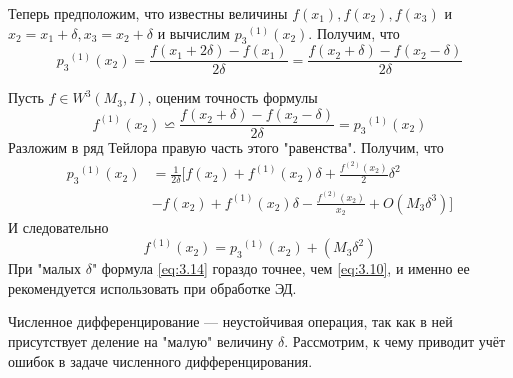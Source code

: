 Теперь предположим, что известны величины $f(x_1), f(x_2), f(x_3)$ и $x_2=x_1+\delta, x_3 = x_2 + \delta$ и вычислим  ${p_3}^{(1)}(x_2)$. Получим, что  
\begin{equation}
	{p_3}^{(1)}(x_2) = \frac{f(x_1+2\delta) - f(x_1)}{2\delta} = \frac{f(x_2+\delta) - f(x_2 - \delta)}{2\delta}
\end{equation}

Пусть $f \in W^3(M_3, I)$, оценим точность формулы
\begin{equation} \label{eq:3.14}
	f^{(1)}(x_2) \backsimeq \frac{f(x_2+\delta) - f(x_2 - \delta)}{2\delta} = {p_3}^{(1)}(x_2)
\end{equation}
Разложим в ряд Тейлора правую часть этого "равенства". Получим, что
\begin{dmath} 
	\begin{aligned}
		{p_3}^{(1)}(x_2) &= \frac{1}{2\delta} [f(x_2) + {f^{(1)}(x_2)}\delta + \frac{f^{(2)}(x_2)}{2} \delta^2 \\ &- f(x_2) + f^{(1)}(x_2)\delta - \frac{f^{(2)}(x_2)}{x_2} + O(M_3\delta^3)]
	\end{aligned}
\end{dmath}
И следовательно
\begin{equation}
	f^{(1)}(x_2) =  {p_3}^{(1)}(x_2) + (M_3\delta^2)
\end{equation}
При "малых $\delta$" формула \ref{eq:3.14} гораздо точнее, чем \ref{eq:3.10}, и именно ее рекомендуется использовать при обработке ЭД.

Численное дифференцирование --- неустойчивая операция, так как в ней присутствует деление на "малую" величину $\delta$. Рассмотрим, к чему приводит учёт ошибок в задаче численного дифференцирования.

